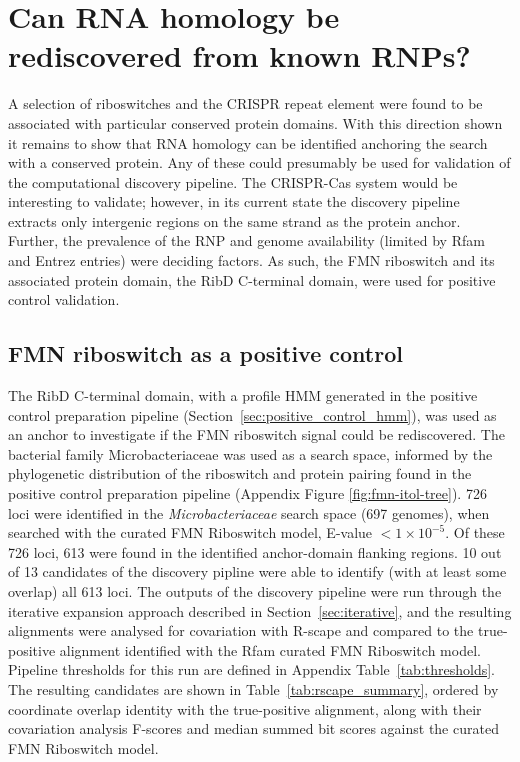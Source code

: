 \section{Can RNA homology be rediscovered from known \ac{RNP}s?}

A selection of riboswitches and the \ac{CRISPR} repeat element were found to be associated with particular conserved protein domains.
With this direction shown it remains to show that RNA homology can be identified anchoring the search with a conserved protein.
Any of these could presumably be used for validation of the computational discovery pipeline.
The \ac{CRISPR}-Cas system would be interesting to validate; however, in its current state the discovery pipeline extracts only intergenic regions on the same strand as the protein anchor.
Further, the prevalence of the \ac{RNP} and genome availability (limited by Rfam and Entrez entries) were deciding factors.
As such, the \ac{FMN} riboswitch and its associated protein domain, the RibD C-terminal domain, were used for positive control validation.

\subsection{\ac{FMN} riboswitch as a positive control}

The RibD C-terminal domain, with a profile \ac{HMM} generated in the positive control preparation pipeline (Section~\ref{sec:positive_control_hmm}), was used as an anchor to investigate if the \ac{FMN} riboswitch signal could be rediscovered.
The bacterial family Microbacteriaceae was used as a search space, informed by the phylogenetic distribution of the riboswitch and protein pairing found in the positive control preparation pipeline (Appendix Figure \ref{fig:fmn-itol-tree}).
726 loci were identified in the \emph{Microbacteriaceae} search space (697 genomes), when searched with the curated \ac{FMN} Riboswitch model, E-value $< 1\times10^{-5}$. 
Of these 726 loci, 613 were found in the identified anchor-domain flanking regions.
10 out of 13 candidates of the discovery pipline were able to identify (with at least some overlap) all 613 loci.
The outputs of the discovery pipeline were run through the iterative expansion approach described in Section~\ref{sec:iterative}, and the resulting alignments were analysed for covariation with R-scape \citep{Rivas2017} and compared to the true-positive alignment identified with the Rfam curated \ac{FMN} Riboswitch model.
Pipeline thresholds for this run are defined in Appendix Table~\ref{tab:thresholds}.
The resulting candidates are shown in Table~\ref{tab:rscape_summary}, ordered by coordinate overlap identity with the true-positive alignment, along with their covariation analysis F-scores and median summed bit scores against the curated \ac{FMN} Riboswitch model.

